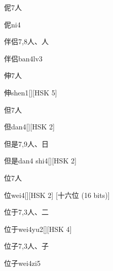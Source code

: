 \begin{entry}{伲}{7}{⼈}
  \begin{phonetics}{伲}{ni4}
  \end{phonetics}
\end{entry}

\begin{entry}{伴侣}{7,8}{⼈、⼈}
  \begin{phonetics}{伴侣}{ban4lv3}
  \end{phonetics}
\end{entry}

\begin{entry}{伸}{7}{⼈}
  \begin{phonetics}{伸}{shen1}[][HSK 5]
  \end{phonetics}
\end{entry}

\begin{entry}{但}{7}{⼈}
  \begin{phonetics}{但}{dan4}[][HSK 2]
  \end{phonetics}
\end{entry}

\begin{entry}{但是}{7,9}{⼈、⽇}
  \begin{phonetics}{但是}{dan4 shi4}[][HSK 2]
  \end{phonetics}
\end{entry}

\begin{entry}{位}{7}{⼈}
  \begin{phonetics}{位}{wei4}[][HSK 2]
    [十六位 (16 bits)]
  \end{phonetics}
\end{entry}

\begin{entry}{位于}{7,3}{⼈、⼆}
  \begin{phonetics}{位于}{wei4yu2}[][HSK 4]
  \end{phonetics}
\end{entry}

\begin{entry}{位子}{7,3}{⼈、⼦}
  \begin{phonetics}{位子}{wei4zi5}
  \end{phonetics}
\end{entry}

